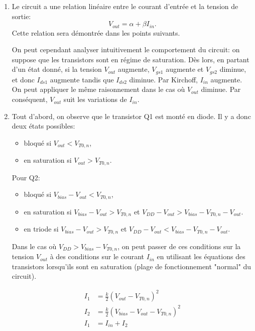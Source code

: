\begin{enumerate}
	\item Le circuit a une relation linéaire entre le courant d'entrée et la tension de sortie:
	\[V_{out} = \alpha + \beta I_{in}.\]
	Cette relation sera démontrée dans les points suivants.

	On peut cependant analyser intuitivement le comportement du circuit: on suppose que les
	transistors sont en régime de saturation. Dès lors, en partant d'un état donné, si la tension
	$V_{out}$ augmente, $V_{gs1}$ augmente et $V_{gs2}$ diminue, et donc $I_{ds1}$ augmente tandis
	que $I_{ds2}$ diminue. Par Kirchoff, $I_{in}$ augmente.
	On peut appliquer le même raisonnement dans le cas où $V_{out}$ diminue. Par conséquent,
	$V_{out}$ suit les variations de $I_{in}$.
	
	\item Tout d'abord, on observe que le transistor Q1 est monté en diode. Il y a donc deux états
	possibles:
	\begin{itemize}
		\item bloqué si $V_{out} < V_{T0,n}$,
		\item en saturation si $V_{out} > V_{T0,n}$.
	\end{itemize}

	Pour Q2:
	\begin{itemize}
		\item bloqué si $V_{bias} - V_{out} < V_{T0,n}$,
		\item en saturation si $V_{bias} - V_{out} > V_{T0,n}$ et $V_{DD} - V_{out} > V_{bias} -
                    V_{T0,n} - V_{out}$.
                \item en triode si $V_{bias} - V_{out} > V_{T0,n}$ et $V_{DD} - V_{out} < V_{bias} - V_{T0,n} - V_{out}$.
	\end{itemize}

	Dans le cas où $V_{DD} > V_{bias} - V_{T0,n}$, on peut passer de ces conditions sur la tension
	$V_{out}$ à des conditions sur le courant $I_{in}$ en utilisant les équations des transistors
	lorsqu'ils sont en saturation (plage de fonctionnement "normal" du circuit).

	\begin{align*}
    	I_1 &= \frac{k}{2}\left(V_{out} - V_{T0,n}\right)^2 \\
    	I_2 &= \frac{k}{2}\left(V_{bias} - V_{out} - V_{T0,n}\right)^2 \\
    	I_{1} &= I_{in} + I_{2}
	\end{align*}
    

\end{enumerate}
